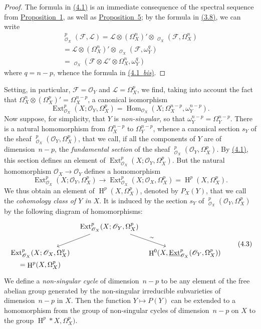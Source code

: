 \documentclass{article}
\theoremstyle{plain}
\theoremstyle{definition}
\newcommand{\scr}[1]{{\mathscr{#1}}}
\DeclareMathOperator{\Ext}{Ext}
\DeclareMathOperator{\Hom}{Hom}
\DeclareMathOperator{\shExt}{\underline{Ext}}
\DeclareMathOperator{\shHom}{\underline{Hom}}
\DeclareMathOperator{\HH}{H}
\newcommand{\oldpage}[1]{\marginpar{\footnotesize$\Big\vert$ \textit{p.~#1}}}
\begin{document}
\begin{proof}
  The formula in \hyperref[4.1]{(4.1)} is an immediate consequence of the spectral sequence from \hyperref[proposition1]{Proposition~1}, as well as \hyperref[proposition5]{Proposition~5};
  by the formula in \hyperref[3.8]{(3.8)}, we can write
\oldpage{149-10}
  \[
    \begin{gathered}
      \shExt_{\scr{O}_X}^p(\scr{F},\scr{L})
      = \scr{L}\otimes(\Omega_X^n)'\otimes\shExt_{\scr{O}_X}(\scr{F},\Omega_X^n)
    \\= \scr{L}\otimes(\Omega_X^n)'\otimes\shHom_{\scr{O}_X}(\scr{F},\omega_Y^q)
    \\= \shHom_{\scr{O}_X}(\scr{F}\otimes\scr{L}'\otimes\Omega_X^n,\omega_Y^q)
    \end{gathered}
  \]
  where $q=n-p$, whence the formula in \hyperref[4.1bis]{(4.1~\emph{bis})}.
\end{proof}

Setting, in particular, $\scr{F}=\scr{O}_Y$ and $\scr{L}=\Omega_X^p$, we find, taking into account the fact that $\Omega_X^n\otimes(\Omega_X^p)'=\Omega_X^{n-p}$, a canonical isomorphism
\[
\label{4.2}
  \Ext_{\scr{O}_X}^p(X;\scr{O}_Y,\Omega_X^p) = \Hom_{\scr{O}_X}(X;\Omega_X^{n-p},\omega_Y^{n-p}).
\tag{4.2}
\]
Now suppose, for simplicity, that $Y$ is \emph{non-singular}, so that $\omega_Y^{n-p}=\Omega_Y^{n-p}$.
There is a natural homomorphism from $\Omega_X^{n-p}$ to $\Omega_Y^{n-p}$, whence a canonical section $s_Y$ of the sheaf $\shExt_{\scr{O}_X}^p(\scr{O}_Y,\Omega_X^p)$, that we call, if all the components of $Y$ are of dimension~$n-p$, the \emph{fundamental section} of the sheaf $\shExt_{\scr{O}_X}^p(\scr{O}_Y,\Omega_X^p)$.
By \hyperref[4.1]{(4.1)}, this section defines an element of $\Ext_{\scr{O}_X}^p(X;\scr{O}_Y,\Omega_X^p)$.
But the natural homomorphism $\scr{O}_X\to\scr{O}_Y$ defines a homomorphism
\[
  \Ext_{\scr{O}_X}^p(X;\scr{O}_Y,\Omega_X^p) \to \Ext_{\scr{O}_X}^p(X;\scr{O}_X,\Omega_X^p) = \HH^p(X,\Omega_X^p).
\]
We thus obtain an element of $\HH^p(X,\Omega_X^p)$, denoted by $P_X(Y)$, that we call the \emph{cohomology class of $Y$ in $X$}.
It is induced by the section $s_Y$ of $\shExt_{\scr{O}_X}^p(\scr{O}_Y,\Omega_X^p)$ by the following diagram of homomorphisms:
\[
\label{4.3}
  \begin{tikzcd}[column sep=tiny]
    & \Ext_{\scr{O}_X}^p(X;\scr{O}_Y,\Omega_X^p) \ar[dl] \ar[dr,"\sim"]
  \\\Ext_{\scr{O}_X}^p(X;\scr{O}_X,\Omega_X^y) && \HH^0(X,\shExt_{\scr{O}_X}^p(\scr{O}_Y,\Omega_X^p))
  \\[-2em]=\HH^p(X,\Omega_X^p)
  \end{tikzcd}
\tag{4.3}
\]
We define a \emph{non-singular cycle} of dimension~$n-p$ to be any element of the free abelian group generated by the non-singular irreducible subvarieties of dimension~$n-p$ in $X$.
Then the function $Y\mapsto P(Y)$ can be extended to a homomorphism from the group of non-singular cycles of dimension~$n-p$ on $X$ to the group $\HH^p*X,\Omega_X^p)$.
\end{document}
